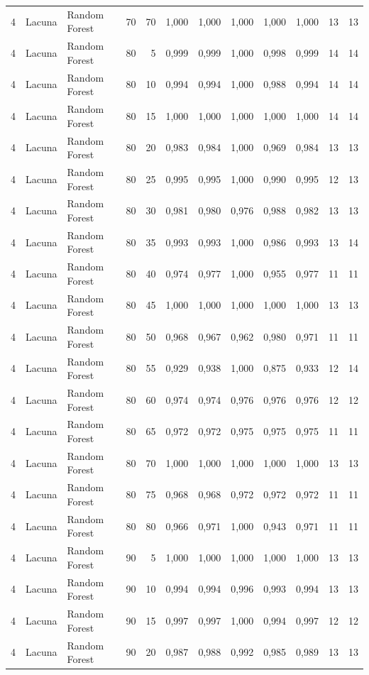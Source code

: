 \begin{longtable}{@{}rllrrrrrrrrr@{}}
4 & Lacuna & Random Forest & 70 & 70 & 1,000 & 1,000 & 1,000 & 1,000 & 1,000 & 13 & 13 \\
4 & Lacuna & Random Forest & 80 & 5 & 0,999 & 0,999 & 1,000 & 0,998 & 0,999 & 14 & 14 \\
4 & Lacuna & Random Forest & 80 & 10 & 0,994 & 0,994 & 1,000 & 0,988 & 0,994 & 14 & 14 \\
4 & Lacuna & Random Forest & 80 & 15 & 1,000 & 1,000 & 1,000 & 1,000 & 1,000 & 14 & 14 \\
4 & Lacuna & Random Forest & 80 & 20 & 0,983 & 0,984 & 1,000 & 0,969 & 0,984 & 13 & 13 \\
4 & Lacuna & Random Forest & 80 & 25 & 0,995 & 0,995 & 1,000 & 0,990 & 0,995 & 12 & 13 \\
4 & Lacuna & Random Forest & 80 & 30 & 0,981 & 0,980 & 0,976 & 0,988 & 0,982 & 13 & 13 \\
4 & Lacuna & Random Forest & 80 & 35 & 0,993 & 0,993 & 1,000 & 0,986 & 0,993 & 13 & 14 \\
4 & Lacuna & Random Forest & 80 & 40 & 0,974 & 0,977 & 1,000 & 0,955 & 0,977 & 11 & 11 \\
4 & Lacuna & Random Forest & 80 & 45 & 1,000 & 1,000 & 1,000 & 1,000 & 1,000 & 13 & 13 \\
4 & Lacuna & Random Forest & 80 & 50 & 0,968 & 0,967 & 0,962 & 0,980 & 0,971 & 11 & 11 \\
4 & Lacuna & Random Forest & 80 & 55 & 0,929 & 0,938 & 1,000 & 0,875 & 0,933 & 12 & 14 \\
4 & Lacuna & Random Forest & 80 & 60 & 0,974 & 0,974 & 0,976 & 0,976 & 0,976 & 12 & 12 \\
4 & Lacuna & Random Forest & 80 & 65 & 0,972 & 0,972 & 0,975 & 0,975 & 0,975 & 11 & 11 \\
4 & Lacuna & Random Forest & 80 & 70 & 1,000 & 1,000 & 1,000 & 1,000 & 1,000 & 13 & 13 \\
4 & Lacuna & Random Forest & 80 & 75 & 0,968 & 0,968 & 0,972 & 0,972 & 0,972 & 11 & 11 \\
4 & Lacuna & Random Forest & 80 & 80 & 0,966 & 0,971 & 1,000 & 0,943 & 0,971 & 11 & 11 \\
4 & Lacuna & Random Forest & 90 & 5 & 1,000 & 1,000 & 1,000 & 1,000 & 1,000 & 13 & 13 \\
4 & Lacuna & Random Forest & 90 & 10 & 0,994 & 0,994 & 0,996 & 0,993 & 0,994 & 13 & 13 \\
4 & Lacuna & Random Forest & 90 & 15 & 0,997 & 0,997 & 1,000 & 0,994 & 0,997 & 12 & 12 \\
4 & Lacuna & Random Forest & 90 & 20 & 0,987 & 0,988 & 0,992 & 0,985 & 0,989 & 13 & 13 \\

\end{longtable}
